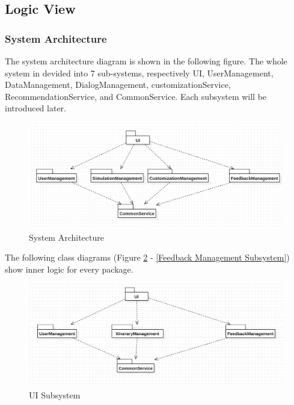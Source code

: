 \documentclass[10pt]{article}
\begin{document}
\subsection{Logic View}
\subsubsection{System Architecture}
The system architecture diagram is shown in the following figure. The whole system in devided into 7 sub-systems, respectively UI, UserManagement, DataManagement, DialogManagement, customizationService, RecommendationService, and CommonService. Each subsystem will be introduced later.

\begin{figure}[H]
	\centering
	
	\includegraphics[width=14cm]{architecture.png}
	\caption{System Architecture}
	\label{System Architecture}
\end{figure}

The following class diagrams (Figure \ref{UI Subsystem} - \ref{Feedback Management Subsystem}) show inner logic for every package.

\begin{figure}[H]
    \centering
    
    \includegraphics[width=14cm]{ui.jpg}
    \caption{UI Subsystem}
    \label{UI Subsystem}
\end{figure}
\end{document}
